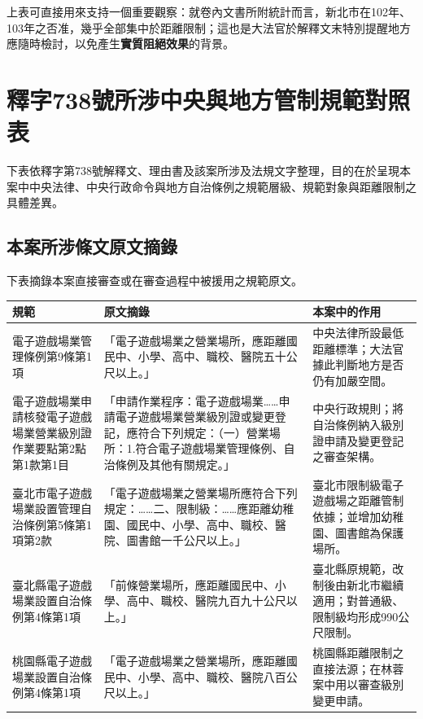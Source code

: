 上表可直接用來支持一個重要觀察：就卷內文書所附統計而言，新北市在102年、103年之否准，幾乎全部集中於距離限制；這也是大法官於解釋文末特別提醒地方應隨時檢討，以免產生\textbf{實質阻絕效果}的背景。

\section{釋字738號所涉中央與地方管制規範對照表}

下表依釋字第738號解釋文、理由書及該案所涉及法規文字整理，目的在於呈現本案中中央法律、中央行政命令與地方自治條例之規範層級、規範對象與距離限制之具體差異。



\subsection{本案所涉條文原文摘錄}

下表摘錄本案直接審查或在審查過程中被援用之規範原文。

\begin{center}
\footnotesize
\setlength{\tabcolsep}{4pt}
\begin{tabularx}{0.94\linewidth}{L{3.6cm}Y L{3.2cm}}
\toprule
規範 & 原文摘錄 & 本案中的作用 \\
\midrule
電子遊戲場業管理條例第9條第1項 &
「電子遊戲場業之營業場所，應距離國民中、小學、高中、職校、醫院五十公尺以上。」 &
中央法律所設最低距離標準；大法官據此判斷地方是否仍有加嚴空間。 \\
\midrule

電子遊戲場業申請核發電子遊戲場業營業級別證作業要點第2點第1款第1目 &
「申請作業程序：電子遊戲場業……申請電子遊戲場業營業級別證或變更登記，應符合下列規定：（一）營業場所：1.符合電子遊戲場業管理條例、自治條例及其他有關規定。」 &
中央行政規則；將自治條例納入級別證申請及變更登記之審查架構。 \\
\midrule

臺北市電子遊戲場業設置管理自治條例第5條第1項第2款 &
「電子遊戲場業之營業場所應符合下列規定：……二、限制級：……應距離幼稚園、國民中、小學、高中、職校、醫院、圖書館一千公尺以上。」 &
臺北市限制級電子遊戲場之距離管制依據；並增加幼稚園、圖書館為保護場所。 \\
\midrule

臺北縣電子遊戲場業設置自治條例第4條第1項 &
「前條營業場所，應距離國民中、小學、高中、職校、醫院九百九十公尺以上。」 &
臺北縣原規範，改制後由新北市繼續適用；對普通級、限制級均形成990公尺限制。 \\
\midrule

桃園縣電子遊戲場業設置自治條例第4條第1項 &
「電子遊戲場業之營業場所，應距離國民中、小學、高中、職校、醫院八百公尺以上。」 &
桃園縣距離限制之直接法源；在林蓉案中用以審查級別變更申請。 \\
\bottomrule
\end{tabularx}
\end{center}




